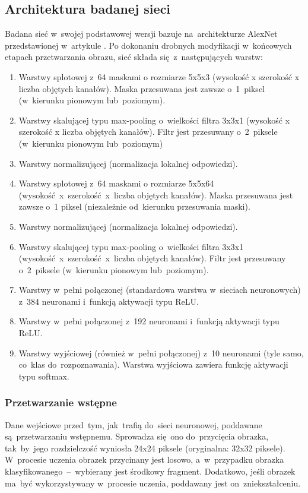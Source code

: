 \subsection{Architektura badanej sieci} \label{ssec:architektura-podstawowa}
Badana sieć w~swojej podstawowej wersji bazuje na~architekturze AlexNet przedstawionej w~artykule \cite{AlexNet}.
Po dokonaniu drobnych modyfikacji w~końcowych etapach przetwarzania obrazu, sieć składa się~z~następujących warstw:
\begin{enumerate}
    \item Warstwy splotowej z~64 maskami o rozmiarze 5x5x3 (wysokość x szerokość x liczba objętych kanałów).
          Maska przesuwana jest zawsze o~1~piksel (w~kierunku pionowym lub~poziomym).
    \item Warstwy skalującej typu max-pooling o~wielkości filtra 3x3x1 (wysokość x szerokość x liczba objętych kanałów).
          Filtr jest przesuwany o~2~piksele (w~kierunku pionowym lub~poziomym)
    \item Warstwy normalizującej (normalizacja lokalnej odpowiedzi).
    \item Warstwy splotowej z~64 maskami o rozmiarze 5x5x64 (wysokość~x~szerokość~x~liczba objętych kanałów).
          Maska przesuwana jest zawsze o~1 piksel (niezależnie od~kierunku przesuwania maski).
    \item Warstwy normalizującej (normalizacja lokalnej odpowiedzi).
    \item Warstwy skalującej typu max-pooling o~wielkości filtra 3x3x1 (wysokość~x~szerokość~x~liczba objętych kanałów).
          Filtr jest przesuwany o~2~piksele (w~kierunku pionowym lub~poziomym).
    \item Warstwy w~pełni połączonej (standardowa warstwa w~sieciach neuronowych) z~384 neuronami i~funkcją aktywacji
          typu ReLU.
    \item Warstwy w~pełni połączonej z~192 neuronami i~funkcją aktywacji
          typu ReLU.
    \item Warstwy wyjściowej (również w~pełni połączonej) z~10 neuronami (tyle samo, co~klas do~rozpoznawania).
          Warstwa wyjściowa zawiera funkcję aktywacji typu softmax.
\end{enumerate}

\subsubsection{Przetwarzanie wstępne}
Dane wejściowe przed~tym, jak~trafią do~sieci neuronowej, poddawane są~przetwarzaniu wstępnemu. Sprowadza się~ono
do~przycięcia obrazka, tak~by~jego rozdzielczość wyniosła 24x24 piksele (oryginalna: 32x32 piksele). W~procesie
uczenia obrazek przycinany jest losowo, a~w~przypadku obrazka klasyfikowanego~--~wybierany jest środkowy fragment.
Dodatkowo, jeśli obrazek ma~być wykorzystywany w~procesie uczenia, poddawany jest on~zniekształceniu.

